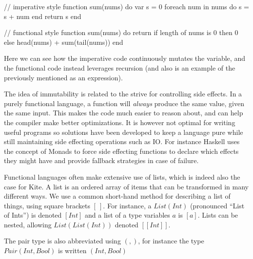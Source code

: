 \begin{pseudo}
// imperative style
function sum(nums) do
  var s = 0
  foreach num in nums do
    s = s + num
  end
  return s
end

// functional style
function sum(nums) do
  return if length of nums is 0
    then 0
    else head(nums) + sum(tail(nums))
end
\end{pseudo}

Here we can see how the imperative code continuously mutates the  variable, and the functional code instead leverages recursion (and also is an example of the previously mentioned  as an expression).

The idea of immutability is related to the strive for controlling side effects. In a purely functional language, a function will \emph{always} produce the same value, given the same input. This makes the code much easier to reason about, and can help the compiler make better optimizations. It is however not optimal for writing useful programs so solutions have been developed to keep a language pure while still maintaining side effecting operations such as IO. For instance Haskell uses the concept of Monads to force side effecting functions to declare which effects they might have and provide fallback strategies in case of failure.

Functional languages often make extensive use of lists, which is indeed also the case for Kite. A list is an ordered array of items that can be transformed in many different ways. We use a common short-hand method for describing a list of things, using square brackets $[\ ]$. For instance, a $List(Int)$ (pronounced ``List of Ints'') is denoted $[Int]$ and a list of a type variables $a$ is $[a]$. Lists can be nested, allowing $List(List(Int))$ denoted $[[Int]]$.

The pair type is also abbreviated using $(,)$, for instance the type $Pair(Int, Bool)$ is written $(Int, Bool)$

